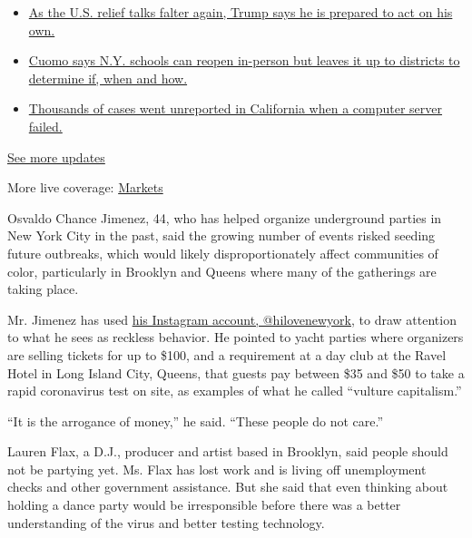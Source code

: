 \begin{itemize}
\tightlist
\item
  \href{https://www.nytimes.com/2020/08/07/world/covid-19-news.html?action=click\&pgtype=Article\&state=default\&region=MAIN_CONTENT_1\&context=storylines_live_updates\#link-1f86d03a}{As
  the U.S. relief talks falter again, Trump says he is prepared to act
  on his own.}
\item
  \href{https://www.nytimes.com/2020/08/07/world/covid-19-news.html?action=click\&pgtype=Article\&state=default\&region=MAIN_CONTENT_1\&context=storylines_live_updates\#link-3f64a70a}{Cuomo
  says N.Y. schools can reopen in-person but leaves it up to districts
  to determine if, when and how.}
\item
  \href{https://www.nytimes.com/2020/08/07/world/covid-19-news.html?action=click\&pgtype=Article\&state=default\&region=MAIN_CONTENT_1\&context=storylines_live_updates\#link-14e70066}{Thousands
  of cases went unreported in California when a computer server failed.}
\end{itemize}

\href{https://www.nytimes.com/2020/08/07/world/covid-19-news.html?action=click\&pgtype=Article\&state=default\&region=MAIN_CONTENT_1\&context=storylines_live_updates}{See
more updates}

More live coverage:
\href{https://www.nytimes.com/live/2020/08/07/business/stock-market-today-coronavirus?action=click\&pgtype=Article\&state=default\&region=MAIN_CONTENT_1\&context=storylines_live_updates}{Markets}

Osvaldo Chance Jimenez, 44, who has helped organize underground parties
in New York City in the past, said the growing number of events risked
seeding future outbreaks, which would likely disproportionately affect
communities of color, particularly in Brooklyn and Queens where many of
the gatherings are taking place.

Mr. Jimenez has used \href{https://www.instagram.com/hilovenewyork/}{his
Instagram account, @hilovenewyork}, to draw attention to what he sees as
reckless behavior. He pointed to yacht parties where organizers are
selling tickets for up to \$100, and a requirement at a day club at the
Ravel Hotel in Long Island City, Queens, that guests pay between \$35
and \$50 to take a rapid coronavirus test on site, as examples of what
he called ``vulture capitalism.''

``It is the arrogance of money,'' he said. ``These people do not care.''

Lauren Flax, a D.J., producer and artist based in Brooklyn, said people
should not be partying yet. Ms. Flax has lost work and is living off
unemployment checks and other government assistance. But she said that
even thinking about holding a dance party would be irresponsible before
there was a better understanding of the virus and better testing
technology.

